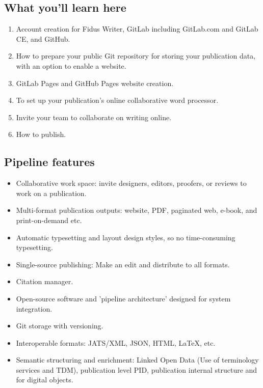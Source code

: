 \documentclass{article}
\begin{document}
\subsection{What you'll learn here}\label{H7757657}


\begin{enumerate}
\item Account creation for Fidus Writer, GitLab including GitLab.com and GitLab CE, and GitHub.


\item How to prepare your public Git repository for storing your publication data, with an option to enable a website.


\item GitLab Pages and GitHub Pages website creation.


\item To set up your publication's online collaborative word processor.


\item Invite your team to collaborate on writing online.


\item How to publish.


\end{enumerate}

\subsection{Pipeline features}\label{H2087393}


\begin{itemize}
\item Collaborative work space: invite designers, editors, proofers, or reviews to work on a publication.


\item Multi-format publication outputs: website, PDF, paginated web, e-book, and print-on-demand etc.


\item Automatic typesetting and layout design styles, so no time-consuming typesetting.


\item Single-source publishing: Make an edit and distribute to all formats.


\item Citation manager.


\item Open-source software and 'pipeline architecture' designed for system integration.


\item Git storage with versioning.


\item Interoperable formats: JATS/XML, JSON, HTML, LaTeX, etc.


\item Semantic structuring and enrichment: Linked Open Data (Use of terminology services and TDM), publication level PID, publication internal structure and for digital objects.


\end{itemize}
\end{document}
